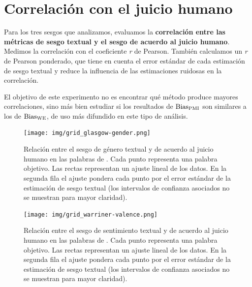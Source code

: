 

\section{Correlación con el juicio humano} \label{sec:experimento_correlacion}

Para los tres sesgos que analizamos, evaluamos la \textbf{correlación entre las métricas de sesgo textual y el sesgo de acuerdo al juicio humano}. Medimos la correlación con el coeficiente \emph{r} de Pearson. También calculamos un \emph{r} de Pearson ponderado, que tiene en cuenta el error estándar de cada estimación de sesgo textual y reduce la influencia de las estimaciones ruidosas en la correlación. 

El objetivo de este experimento no es encontrar qué método produce mayores correlaciones, sino más bien estudiar si los resultados de $\operatorname{Bias_{PMI}}$ son similares a los de $\operatorname{Bias_{WE}}$, de uso más difundido en este tipo de análisis. 



\begin{figure}[H]
    \centering
    \texttt{[image: img/grid\_glasgow-gender.png]}
    \caption[Relación entre el sesgo de género textual y de acuerdo al juicio humano en las palabras de \citet{lewis2020gender}]{
        Relación entre el sesgo de género textual y de acuerdo al juicio humano en las palabras de \citet{lewis2020gender}. Cada punto representa una palabra objetivo. Las rectas representan un ajuste lineal de los datos. En la segunda fila el ajuste pondera cada punto por el error estándar de la estimación de sesgo textual (los intervalos de confianza asociados no se muestran para mayor claridad).
    }
    \label{fig:grid_corr_genero}
\end{figure}

\begin{figure}[H]
    \centering
    \texttt{[image: img/grid\_warriner-valence.png]}
    \caption[Relación entre el sesgo de sentimiento textual y de acuerdo al juicio humano en las palabras de \citet{toney2021valnorm}]{
        Relación entre el sesgo de sentimiento textual y de acuerdo al juicio humano en las palabras de \citet{toney2021valnorm}. Cada punto representa una palabra objetivo. Las rectas representan un ajuste lineal de los datos. En la segunda fila el ajuste pondera cada punto por el error estándar de la estimación de sesgo textual (los intervalos de confianza asociados no se muestran para mayor claridad).
    }
    \label{fig:grid_corr_sentimiento}
\end{figure}

